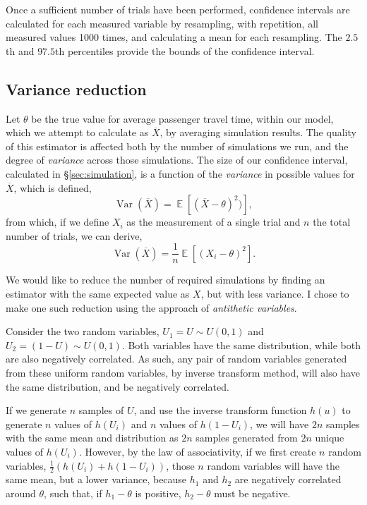 \documentclass[12pt]{article}
\theoremstyle{definition}
\DeclareMathOperator{\Exp}{\mathbb E}
\DeclareMathOperator{\Var}{Var}
\begin{document}
Once a sufficient number of trials have been performed, confidence intervals
are calculated for each measured variable by resampling, with repetition, all
measured values 1000 times, and calculating a mean for each resampling. The
$2.5$th and $97.5$th percentiles provide the bounds of the confidence
interval.

\subsection{Variance reduction}

Let $\theta$ be the true value for average passenger travel time, within our
model, which we attempt to calculate as $\overline{X}$, by averaging
simulation results. The quality of this estimator is affected both by the
number of simulations we run, and the degree of \emph{variance} across those
simulations. The size of our confidence interval, calculated in
\S\ref{sec:simulation}, is a function of the \emph{variance} in possible
values for $\overline{X}$, which is defined,
\[
    \Var(\overline{X}) = \Exp[(\overline{X} - \theta)^2)],
\]
from which, if we define $X_i$ as the measurement of a single trial and $n$
the total number of trials, we can derive,
\[
    \Var(\overline{X}) = \frac{1}{n}\Exp[(X_i - \theta)^2].
\]

We would like to reduce the number of required simulations by finding an
estimator with the same expected value as $X$, but with less variance. I chose
to make one such reduction using the approach of \emph{antithetic
variables}\cite{sheldonross_varianceReduction_2006}.

Consider the two random variables, $U_1 = U \sim U(0, 1)$ and $U_2 = (1 - U)
\sim U(0, 1)$. Both variables have the same distribution, while both are also
negatively correlated. As such, any pair of random variables generated from these
uniform random variables, by inverse transform method, will also have the same
distribution, and be negatively correlated.

If we generate $n$ samples of $U$, and use the inverse transform function
$h(u)$ to generate $n$ values of $h(U_i)$ and $n$ values of $h(1 - U_i)$, we
will have $2n$ samples with the same mean and distribution as $2n$ samples
generated from $2n$ unique values of $h(U_i)$. However, by the law of
associativity, if we first create $n$ random variables,
$\frac{1}{2}\left(h(U_i) + h(1 - U_i)\right)$, those $n$ random variables will
have the same mean, but a lower variance, because $h_1$ and $h_2$ are
negatively correlated around $\theta$, such that, if $h_1 - \theta$ is
positive, $h_2 - \theta$ must be negative.
\end{document}
